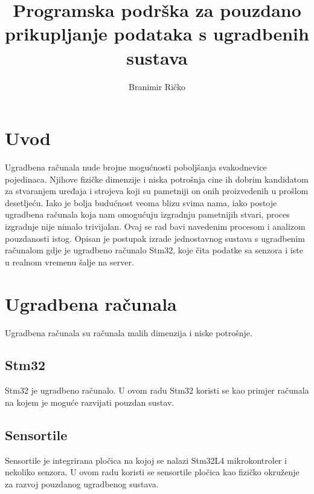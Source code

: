 \documentclass[times, utf8, diplomski]{diplomski}
\begin{document}

\title{Programska podrška za pouzdano prikupljanje podataka s ugradbenih sustava}

\author{Branimir Ričko}

\maketitle


\tableofcontents

\chapter{Uvod}
Ugradbena računala nude brojne mogućnosti poboljšanja svakodnevice pojedinaca. Njihove fizičke dimenzije i niska potrošnja cine ih dobrim kandidatom za stvaranjem uređaja i strojeva koji su pametniji on onih proizvedenih u prošlom desetljeću. Iako je bolja budućnost veoma blizu svima nama, iako postoje ugradbena računala koja nam omogućuju izgradnju pametnijih stvari, proces izgradnje nije nimalo trivijalan. Ovaj se rad bavi navedenim procesom i analizom pouzdanosti istog. Opisan je postupak izrade jednostavnog sustava s ugradbenim računalom gdje je ugradbeno računalo Stm32, koje čita podatke sa senzora i iste u realnom vremenu šalje na server.

\chapter{Ugradbena računala}
Ugradbena računala su računala malih dimenzija i niske potrošnje. 

\section{Stm32}
Stm32 \cite{STM32L476JG} je ugradbeno računalo. U ovom radu Stm32 koristi se kao primjer računala na kojem je moguće razvijati pouzdan sustav.

\section{Sensortile}
Sensortile \cite{sensortile} je integrirana pločica na kojoj se nalazi Stm32L4 mikrokontroler i nekoliko senzora. U ovom radu koristi se sensortile pločica kao fizičko okruženje za razvoj pouzdanog ugradbenog sustava.
 
\end{document}
